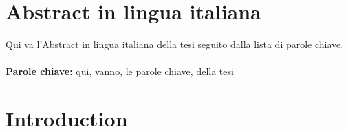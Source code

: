 \documentclass{Configuration_Files/PoliMi3i_thesis}
\begin{document}
\chapter*{Abstract in lingua italiana}
Qui va l'Abstract in lingua italiana della tesi seguito dalla lista di parole chiave.
\\
\\
\textbf{Parole chiave:} qui, vanno, le parole chiave, della tesi %


\thispagestyle{empty}
\tableofcontents %
\thispagestyle{empty}
\cleardoublepage

%
%
%    
%

\mainmatter %

\chapter*{Introduction}
\end{document}
